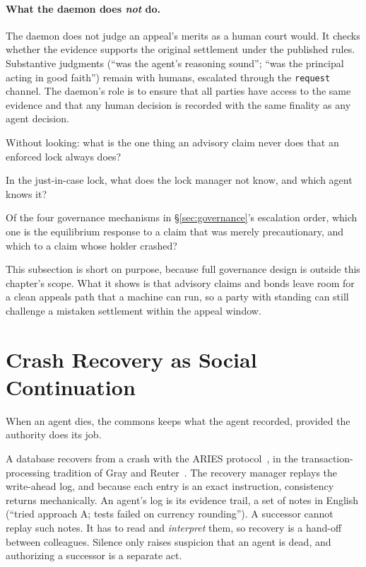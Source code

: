 \documentclass[11pt,a4paper]{article}
\theoremstyle{definition}
\theoremstyle{remark}
\begin{document}
\paragraph{What the daemon does \emph{not} do.} The daemon does not judge an appeal's merits as a human court would. It checks whether the evidence supports the original settlement under the published rules. Substantive judgments (``was the agent's reasoning sound''; ``was the principal acting in good faith'') remain with humans, escalated through the \texttt{request} channel. The daemon's role is to ensure that all parties have access to the same evidence and that any human decision is recorded with the same finality as any agent decision.

\pdexercisepointerone*{\ref{ex:bonded-advisory-claims}}{\pageref{ex:bonded-advisory-claims}}

\begin{pdrecitation}
\item Without looking: what is the one thing an advisory claim never does that an enforced lock always does?
\item In the just-in-case lock, what does the lock manager not know, and which agent knows it?
\item Of the four governance mechanisms in \S\ref{sec:governance}'s escalation order, which one is the equilibrium response to a claim that was merely precautionary, and which to a claim whose holder crashed?
\end{pdrecitation}

This subsection is short on purpose, because full governance design is outside this chapter's scope. What it shows is that advisory claims and bonds leave room for a clean appeals path that a machine can run, so a party with standing can still challenge a mistaken settlement within the appeal window.

\section{Crash Recovery as Social Continuation}\label{sec:crash-recovery}

When an agent dies, the commons keeps what the agent recorded, provided the authority does its job.

A database recovers from a crash with the ARIES protocol~, in the transaction-processing tradition of Gray and Reuter~. The recovery manager replays the write-ahead log, and because each entry is an exact instruction, consistency returns mechanically. An agent's log is its evidence trail, a set of notes in English (``tried approach A; tests failed on currency rounding''). A successor cannot replay such notes. It has to read and \emph{interpret} them, so recovery is a hand-off between colleagues. Silence only raises suspicion that an agent is dead, and authorizing a successor is a separate act.
\end{document}
